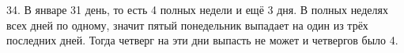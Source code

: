 34. В январе 31 день, то есть 4 полных недели и ещё 3 дня. В полных неделях всех дней по одному, значит пятый понедельник выпадает на один из трёх последних дней. Тогда четверг на эти дни выпасть не может и четвергов было 4.\\
